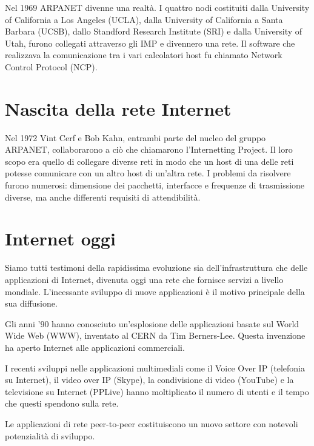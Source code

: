 Nel 1969 ARPANET divenne una realtà. I quattro nodi costituiti dalla University of California a Los Angeles (UCLA), dalla University of California a Santa Barbara (UCSB), dallo Standford Research Institute (SRI) e dalla University of Utah, furono collegati attraverso gli IMP e divennero una rete. Il software che realizzava la comunicazione tra i vari calcolatori host fu chiamato Network Control Protocol (NCP).

\section{Nascita della rete Internet}
Nel 1972 Vint Cerf e Bob Kahn, entrambi parte del nucleo del gruppo ARPANET, collaborarono a ciò che chiamarono l'Internetting Project. Il loro scopo era quello di collegare diverse reti in modo che un host di una delle reti potesse comunicare con un altro host di un'altra rete. I problemi da risolvere furono numerosi: dimensione dei pacchetti, interfacce e frequenze di trasmissione diverse, ma anche differenti requisiti di attendibilità.

\section{Internet oggi}
Siamo tutti testimoni della rapidissima evoluzione sia dell'infrastruttura che delle applicazioni di Internet, divenuta oggi una rete che fornisce servizi a livello mondiale. L'incessante sviluppo di nuove applicazioni è il motivo principale della sua diffusione.

Gli anni '90 hanno conosciuto un'esplosione delle applicazioni basate sul World Wide Web (WWW), inventato al CERN da Tim Berners-Lee. Questa invenzione ha aperto Internet alle applicazioni commerciali.

I recenti sviluppi nelle applicazioni multimediali come il Voice Over IP (telefonia su Internet), il video over IP (Skype), la condivisione di video (YouTube) e la televisione su Internet (PPLive) hanno moltiplicato il numero di utenti e il tempo che questi spendono sulla rete.

Le applicazioni di rete peer-to-peer costituiscono un nuovo settore con notevoli potenzialità di sviluppo.

